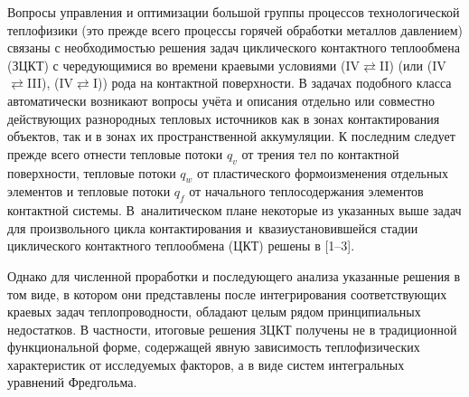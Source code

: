 

\date{21/V/2012}

\maketitle


Вопросы управления и оптимизации большой группы процессов
технологической теплофизики (это прежде всего процессы горячей
обработки металлов давлением) связаны с необходимостью решения
задач циклического контактного теплообмена (ЗЦКТ) с чередующимися
во времени краевыми условиями (IV$\rightleftarrows$II) (или
(IV$\rightleftarrows$III), (IV$\rightleftarrows$I)) рода на
контактной поверхности. В задачах подобного класса автоматически
возникают вопросы учёта и описания отдельно или совместно
действующих разнородных тепловых источников как в зонах
контактирования объектов, так и в зонах их пространственной
аккумуляции. К последним следует прежде всего отнести тепловые
потоки $q_v$ от трения тел по контактной поверхности, тепловые
потоки $q_w$ от пластического формоизменения отдельных элементов и
тепловые потоки $q_f$ от начального теплосодержания элементов
контактной системы. В~аналитическом плане некоторые из указанных
выше задач для произвольного цикла контактирования и~квазиустановившейся стадии циклического контактного теплообмена
(ЦКТ) решены в [1--3].

Однако для численной проработки и последующего анализа указанные решения в
том виде, в котором они представлены после интегрирования соответствующих
краевых задач теплопроводности, обладают целым рядом принципиальных
недостатков. В частности, итоговые решения ЗЦКТ получены не в традиционной
функциональной форме, содержащей явную зависимость теплофизических
характеристик от исследуемых факторов, а в виде систем интегральных
уравнений Фредгольма.


